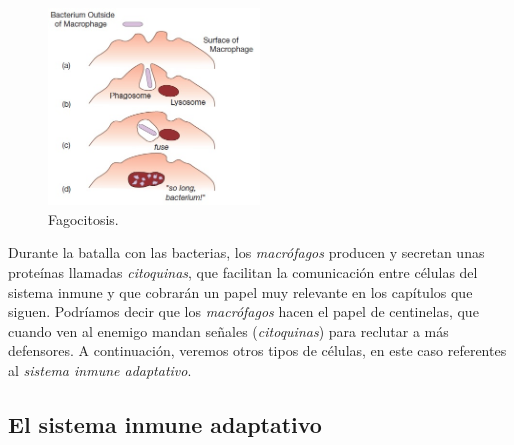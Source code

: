 \begin{figure}[t]
	\centering
	\includegraphics[width=0.5\textwidth]{1_macrofago}
	\caption{Fagocitosis.}
	\label{fig:macrofago}
\end{figure}


Durante la batalla con las bacterias, los \textit{macrófagos} producen y secretan unas proteínas llamadas \textit{citoquinas}, que facilitan la comunicación entre células del sistema inmune y que cobrarán un papel muy relevante en los capítulos que siguen.
Podríamos decir que los \textit{macrófagos} hacen el papel de centinelas, que cuando ven al enemigo mandan señales (\textit{citoquinas}) para reclutar a más defensores. A continuación, veremos otros tipos de células, en este caso referentes al \textit{sistema inmune adaptativo}.

\subsection{El sistema inmune adaptativo}
\label{sub:sistInmAdap}

